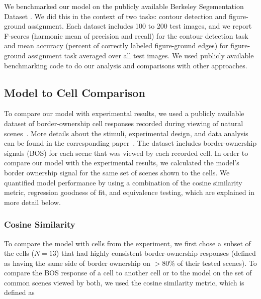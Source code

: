 We benchmarked our model on the publicly available Berkeley Segementation Dataset \citep{Martin_etal01}. We did this in the context of two tasks: contour detection and figure-ground assignment. Each dataset includes 100 to 200 test images, and we report F-scores (harmonic mean of precision and recall) for the contour detection task and mean accuracy (percent of correctly labeled figure-ground edges) for figure-ground assignment task averaged over all test images. We used publicly available benchmarking code to do our analysis and comparisons with other approaches.

\subsection{Model to Cell Comparison}
\label{sec:cell_model}
To compare our model with experimental results, we used a publicly available dataset of border-ownership cell responses recorded during viewing of natural scenes~\citep{Jonathan_data}. More details about the stimuli, experimental design, and data analysis can be found in the corresponding paper~\citep{Williford_vonderHeydt16}.
The dataset includes border-ownership signals (BOS) for each scene that was viewed by each recorded cell. In order to compare our model with the experimental results, we calculated the model's border ownership signal for the same set of scenes shown to the cells. We quantified model performance by using a combination of the cosine similarity metric, regression goodness of fit, and equivalence testing, which are explained in more detail below.
%

\subsubsection{Cosine Similarity}
To compare the model with cells from the experiment, we first chose a subset of the cells ($N=13$) that had highly consistent border-ownership responses (defined as having the same side of border ownership on $>$80\% of their tested scenes). To compare the BOS response of a cell to another cell or to the model on the set of common scenes viewed by both, we used the cosine similarity metric, which is defined as

